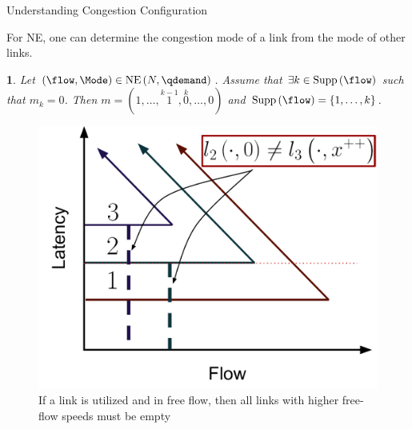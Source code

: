 \documentclass[xcolor=svgnames, english, smaller]{beamer}
\theoremstyle{plain}
\theoremstyle{definition}
\theoremstyle{plain}
\theoremstyle{plain}
\newtheorem{cor}[thm]{\protect\corollaryname}
\providecommand{\corollaryname}{Corollary}
\begin{document}
\begin{frame}{Understanding Congestion Configuration}

For NE, one can determine the congestion mode of a link from the mode
of other links.
\begin{cor}
Let $\left(\flow,\Mode\right)\in\NashEquilibrium{\NLinks}{\qdemand}$.
Assume that $\exists k\in\Supp{\flow}$ such that $m_{k}=0$. Then
$m=(1,\dots,\overset{k-1}{1},\overset{k}{0},\dots,0)$ and $\Supp{\flow}=\left\{ 1,\dots,k\right\} $.
\end{cor}
\begin{figure}
\begin{centering}
\includegraphics[scale=0.25]{../../figures/presentation/CorollaryAllaboveFFareempty}
\par\end{centering}

\caption{If a link is utilized and in free flow, then all links with higher
free-flow speeds must be empty}
\end{figure}



\end{frame}
\end{document}
